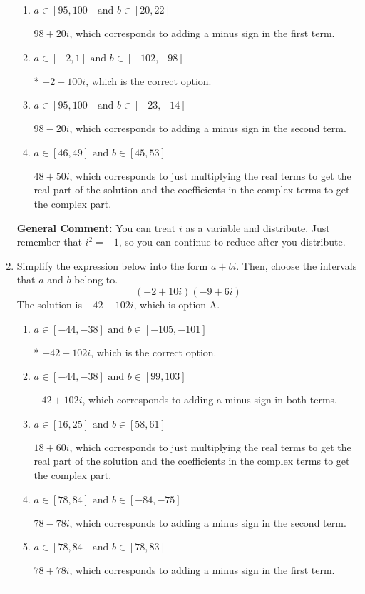 \documentclass{extbook}[14pt]
\newcommand{\litem}[1]{\item #1

\rule{\textwidth}{0.4pt}}
\begin{document}
\begin{enumerate}
{\begin{enumerate}[label=\Alph*.]
 $-2 + 100 i$, which corresponds to adding a minus sign in both terms.
\item \( a \in [95, 100] \text{ and } b \in [20, 22] \)

 $98 + 20 i$, which corresponds to adding a minus sign in the first term.
\item \( a \in [-2, 1] \text{ and } b \in [-102, -98] \)

* $-2 - 100 i$, which is the correct option.
\item \( a \in [95, 100] \text{ and } b \in [-23, -14] \)

 $98 - 20 i$, which corresponds to adding a minus sign in the second term.
\item \( a \in [46, 49] \text{ and } b \in [45, 53] \)

 $48 + 50 i$, which corresponds to just multiplying the real terms to get the real part of the solution and the coefficients in the complex terms to get the complex part.
\end{enumerate}

\textbf{General Comment:} You can treat $i$ as a variable and distribute. Just remember that $i^2=-1$, so you can continue to reduce after you distribute.
}
\litem{
Simplify the expression below into the form $a+bi$. Then, choose the intervals that $a$ and $b$ belong to.
\[ (-2 + 10 i)(-9 + 6 i) \]The solution is \( -42 - 102 i \), which is option A.\begin{enumerate}[label=\Alph*.]
\item \( a \in [-44, -38] \text{ and } b \in [-105, -101] \)

* $-42 - 102 i$, which is the correct option.
\item \( a \in [-44, -38] \text{ and } b \in [99, 103] \)

 $-42 + 102 i$, which corresponds to adding a minus sign in both terms.
\item \( a \in [16, 25] \text{ and } b \in [58, 61] \)

 $18 + 60 i$, which corresponds to just multiplying the real terms to get the real part of the solution and the coefficients in the complex terms to get the complex part.
\item \( a \in [78, 84] \text{ and } b \in [-84, -75] \)

 $78 - 78 i$, which corresponds to adding a minus sign in the second term.
\item \( a \in [78, 84] \text{ and } b \in [78, 83] \)

 $78 + 78 i$, which corresponds to adding a minus sign in the first term.
\end{enumerate}

}
\end{enumerate}
\end{document}
